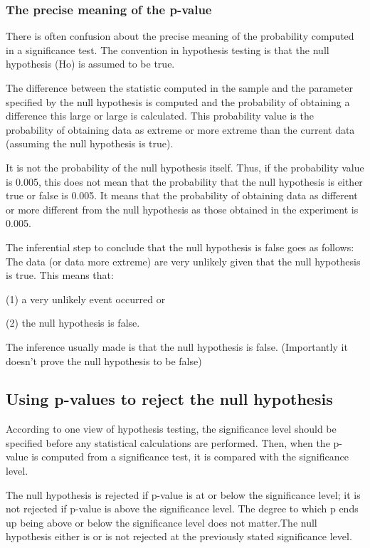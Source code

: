 \subsubsection{The precise meaning of the p-value}

There is often confusion about the precise meaning of the probability computed in a significance test. The convention in hypothesis testing is that the null hypothesis (Ho) is assumed to be true.

The difference between the statistic computed in the sample and the parameter specified by the null hypothesis is computed and the probability of obtaining a difference this large or large is calculated. This probability value is the probability of obtaining data as extreme or more extreme than the current data (assuming the null hypothesis is true).

It is not the probability of the null hypothesis itself. Thus, if the probability value is 0.005, this does not mean that the probability that the null hypothesis is either true or false is 0.005. It means that the probability of obtaining data as different or more different from the null hypothesis as those obtained in the experiment is 0.005.

The inferential step to conclude that the null hypothesis is false goes as follows: The data (or data more extreme) are very unlikely given that the null hypothesis is true.
This means that:

(1) a very unlikely event occurred or

(2) the null hypothesis is false.

The inference usually made is that the null hypothesis is false.  (Importantly it doesn't prove the null hypothesis to be false)

\subsection{Using p-values to reject the null hypothesis}
According to one view of hypothesis testing, the significance level should be specified before any statistical calculations are performed. Then, when the p-value is computed from a significance test, it is compared with the significance level.

The null hypothesis is rejected if p-value is at or below the significance level; it is not rejected if p-value is above the significance level. The degree to which p ends up being above or below the significance level does not matter.The null hypothesis either is or is not rejected at the previously stated significance level.


